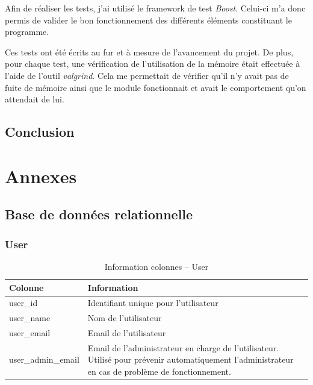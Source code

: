 \documentclass[a4paper,10pt, twoside]{report}
\begin{document}
\begin{spacing}{1.2}
Afin de r\'ealiser les tests, j'ai utilis\'e le framework de test
\textit{Boost}. Celui-ci m'a donc permis de valider le bon fonctionnement des
diff\'erents \'el\'ements constituant le programme.

Ces tests ont \'et\'e \'ecrits au fur et \`a mesure de l'avancement du projet.
De plus, pour chaque test, une v\'erification de l'utilisation de la m\'emoire
\'etait effectu\'ee \`a l'aide de l'outil \textit{valgrind}. Cela me permettait
de v\'erifier qu'il n'y avait pas de fuite de m\'emoire ainsi que le module
fonctionnait et avait le comportement qu'on attendait de lui.

\chapter{Conclusion}


\newpage
\listoffigures
\listoftables



\appendix
\makeatletter
\def\@seccntformat#1{Annexe~\csname the#1\endcsname:\quad}
\makeatother
\part{Annexes}
\chapter{Base de donn\'ees relationnelle}
\thispagestyle{fancy}
\label{annBDR}
\thispagestyle{fancy}
\section{User}
\begin{table}[h!]
  \centering
  \def\arraystretch{1.5}
  \setlength{\fboxsep}{13pt} %
  \setlength{\fboxrule}{0pt} %
  \begin{tabular}{lm{6cm}m{6cm}}
   \rowcolor{arkred} 
    \arrayrulecolor{gray73}\hline
    \color{white} \textbf{Colonne} & \color{white} \textbf{Information}\\
    \hline
    user\_id & Identifiant unique pour l'utilisateur\\
    \hline
    user\_name & Nom de l'utilisateur\\
    \hline
    user\_email & Email de l'utilisateur\\
    \hline
    user\_admin\_email & Email de l'administrateur en charge de l'utilisateur.
    Utilis\'e pour pr\'evenir automatiquement l'administrateur en cas de
    probl\`eme de fonctionnement.
  \end{tabular}
  \caption{\label{tabDBRUser} Information colonnes -- User}
\end{table}


\end{spacing}
\end{document}
